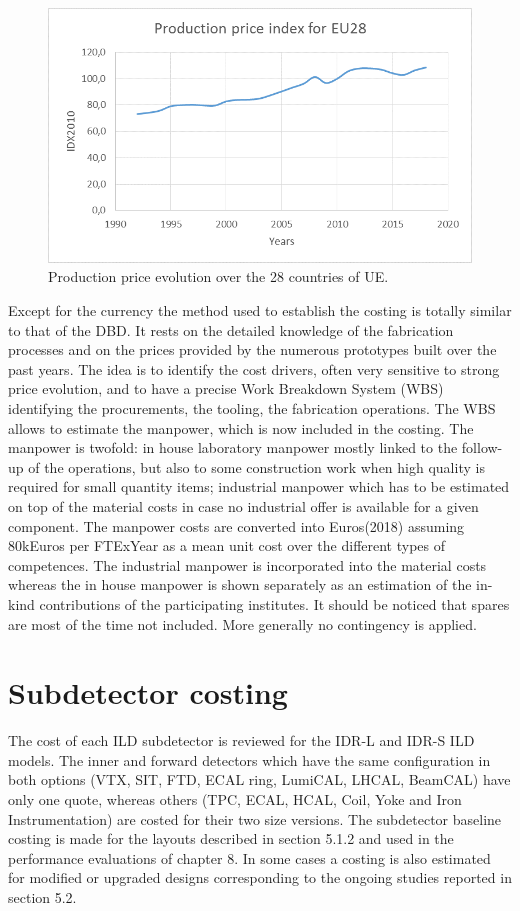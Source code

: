 \begin{figure}[h!]
\centering
\includegraphics[width=1.0\hsize]{Costing/price_index.png}
\caption{Production price evolution over the 28 countries of UE.}
\label{price_index}
\end{figure}

Except for the currency the method used to establish the costing is totally similar to that of the DBD. It rests on the detailed knowledge of the fabrication processes and on the prices provided by the numerous prototypes built over the past years.  The idea is to identify the cost drivers, often very sensitive to strong price evolution, and to have a precise Work Breakdown System (WBS) identifying the procurements, the tooling, the fabrication operations. The WBS allows to estimate the manpower, which is now included in the costing. The manpower is twofold: in house laboratory  manpower mostly linked to the follow-up of the operations, but also to some construction work when high quality is required for small quantity items; industrial manpower which has to be estimated on top of the material costs in case no industrial offer is available for a given component. The manpower costs are converted into Euros(2018) assuming 80kEuros per FTExYear as a mean unit cost over the different types of competences. The industrial manpower is incorporated into the material costs whereas the in house manpower is shown separately as an estimation of the in-kind contributions of the participating institutes. 
It should be noticed that spares are most of the time not included. More generally no contingency is applied.

\section{Subdetector costing}
The cost of each ILD subdetector is reviewed for the IDR-L and IDR-S ILD models. The inner and forward detectors which have the same configuration in both options (VTX, SIT, FTD, ECAL ring, LumiCAL, LHCAL, BeamCAL) have only one quote, whereas others (TPC, ECAL, HCAL, Coil, Yoke and Iron Instrumentation) are costed for their two size versions. The subdetector baseline costing is made for the layouts described in section 5.1.2 and used in the performance evaluations of chapter 8. In some cases a costing is also estimated for modified or upgraded designs corresponding to the ongoing studies reported in section 5.2.   

